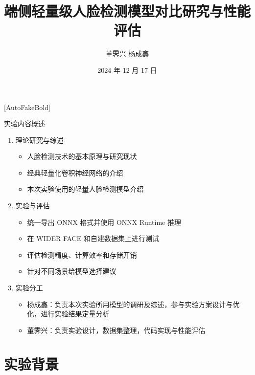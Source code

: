 \documentclass{beamer}
\author{董霁兴 \space 杨成鑫}  %
\title{端侧轻量级人脸检测模型对比研究与性能评估}  %
\institute{山东师范大学信息科学与工程学院}  %
\date{2024 年 12 月 17 日}  %
\begin{document}
\let\kaishu\relax %
\newCJKfontfamily\kaishu{KaiTi}[AutoFakeBold] %
\kaishu  %
\begin{frame}
    \titlepage  %
\end{frame}

\begin{frame}
    \tableofcontents
\end{frame}

\begin{frame}{实验内容概述}
    \begin{enumerate}
        \item 理论研究与综述
        \begin{itemize}
            \item 人脸检测技术的基本原理与研究现状
            \item 经典轻量化卷积神经网络的介绍
            \item 本次实验使用的轻量人脸检测模型介绍
        \end{itemize}
        \item 实验与评估
        \begin{itemize}
            \item 统一导出 ONNX 格式并使用 ONNX Runtime 推理
            \item 在 WIDER FACE 和自建数据集上进行测试
            \item 评估检测精度、计算效率和存储开销
            \item 针对不同场景给模型选择建议
        \end{itemize}
        \item 实验分工
        \begin{itemize}
            \item 杨成鑫：负责本次实验所用模型的调研及综述，参与实验方案设计与优化，进行实验结果定量分析
            \item 董霁兴：负责实验设计，数据集整理，代码实现与性能评估
        \end{itemize}
    \end{enumerate}
\end{frame}


\section{实验背景}
\end{document}
